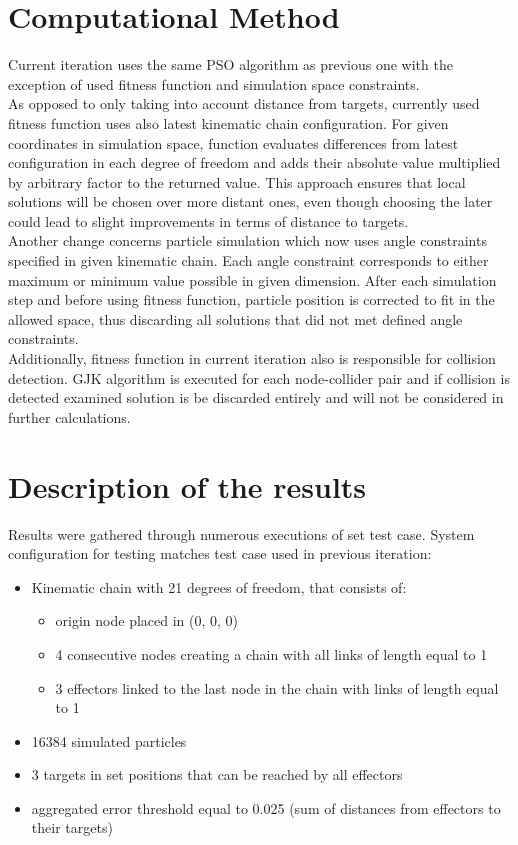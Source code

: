 \documentclass[]{report}
\begin{document}
\chapter*{Computational Method}
\noindent Current iteration uses the same PSO algorithm as previous one with the exception of used fitness function and simulation space constraints. \\

\noindent As opposed to only taking into account distance from targets, currently used fitness function uses also latest kinematic chain configuration. For given coordinates in simulation space, function evaluates differences from latest configuration in each degree of freedom and adds their absolute value multiplied by arbitrary factor to the returned value. This approach ensures that local solutions will be chosen over more distant ones, even though choosing the later could lead to slight improvements in terms of distance to targets.\\

\noindent Another change concerns particle simulation which now uses angle constraints specified in given kinematic chain. Each angle constraint corresponds to either maximum or minimum value possible in given dimension. After each simulation step and before using fitness function, particle position is corrected to fit in the allowed space, thus discarding all solutions that did not met defined angle constraints.\\

\noindent Additionally, fitness function in current iteration also is responsible for collision detection. GJK algorithm is executed for each node-collider pair and if collision is detected examined solution is be discarded entirely and will not be considered in further calculations.

\chapter*{Description of the results}

\noindent Results were gathered through numerous executions of set test case. System configuration for testing matches test case used in previous iteration:

\begin{itemize}
	\item Kinematic chain with 21 degrees of freedom, that consists of:
	\begin{itemize}
		\item origin node placed in (0, 0, 0)
		\item 4 consecutive nodes creating a chain with all links of length equal to 1
		\item 3 effectors linked to the last node in the chain with links of length equal to 1
	\end{itemize}
	\item 16384 simulated particles
	\item 3 targets in set positions that can be reached by all effectors
	\item aggregated error threshold equal to 0.025 (sum of distances from effectors to their targets)
\end{itemize}
\end{document}
